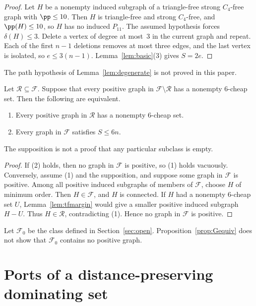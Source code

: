 \begin{proof}
Let $H$ be a nonempty induced subgraph of a triangle-free strong $C_4$-free graph with $\pp\le 10$. Then $H$ is triangle-free and strong $C_4$-free, and $\pp(H)\le 10$, so $H$ has no induced $P_{11}$. The assumed hypothesis forces $\delta(H)\le 3$. Delete a vertex of degree at most~$3$ in the current graph and repeat. Each of the first $n-1$ deletions removes at most three edges, and the last vertex is isolated, so $e\le 3(n-1)$. Lemma~\ref{lem:basic}(3) gives $S=2e$.
\end{proof}

The path hypothesis of Lemma~\ref{lem:degenerate} is not proved in this paper.

\begin{proposition}\label{prop:Gequiv}
Let $\mathcal R\subseteq\mathcal F$. Suppose that every positive graph in $\mathcal F\setminus\mathcal R$ has a nonempty $6$-cheap set. Then the following are equivalent.
\begin{enumerate}
\item Every positive graph in $\mathcal R$ has a nonempty $6$-cheap set.
\item Every graph in $\mathcal F$ satisfies $S\le 6n$.
\end{enumerate}
The supposition is not a proof that any particular subclass is empty.
\end{proposition}

\begin{proof}
If (2) holds, then no graph in $\mathcal F$ is positive, so (1) holds vacuously. Conversely, assume (1) and the supposition, and suppose some graph in $\mathcal F$ is positive. Among all positive induced subgraphs of members of $\mathcal F$, choose $H$ of minimum order. Then $H\in\mathcal F$, and $H$ is connected. If $H$ had a nonempty $6$-cheap set $U$, Lemma~\ref{lem:tfmargin} would give a smaller positive induced subgraph $H-U$. Thus $H\in\mathcal R$, contradicting (1). Hence no graph in $\mathcal F$ is positive.
\end{proof}

Let $\mathcal F_0$ be the class defined in Section~\ref{sec:open}. Proposition~\ref{prop:Gequiv} does not show that $\mathcal F_0$ contains no positive graph.

\section{Ports of a distance-preserving dominating set}\label{app:ports}

